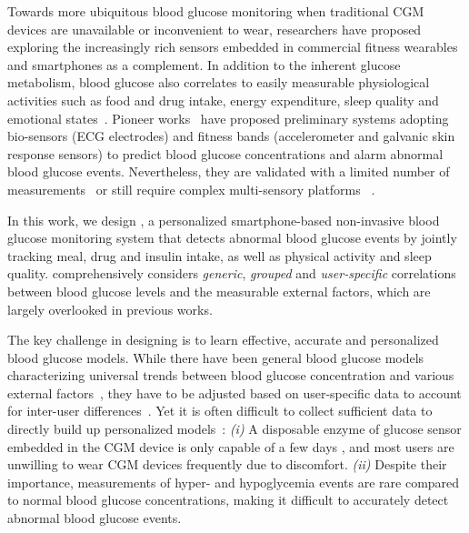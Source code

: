 Towards more ubiquitous blood glucose monitoring when traditional CGM devices are unavailable or inconvenient to wear, researchers have proposed exploring the increasingly rich sensors embedded in commercial fitness wearables and smartphones as a complement.
In addition to the inherent glucose metabolism, blood glucose also correlates to easily measurable physiological activities such as food and drug intake, energy expenditure, sleep quality and emotional states~\cite{bib:DRCP15:Iwasaki}.
Pioneer works~\cite{bib:EMBC12:Nguyen} \cite{bib:SEMPER16:Ranvier} \cite{bib:JDST14:Sobel} have proposed preliminary systems adopting bio-sensors (\eg ECG electrodes) and fitness bands (\eg accelerometer and galvanic skin response sensors) to predict blood glucose concentrations and alarm abnormal blood glucose events.
Nevertheless, they are validated with a limited number of measurements~\cite{bib:SEMPER16:Ranvier}  or still require complex multi-sensory platforms~\cite{bib:EMBC12:Nguyen} \cite{bib:JDST14:Sobel}.

In this work, we design \sysname, a personalized smartphone-based non-invasive blood glucose monitoring system that detects abnormal blood glucose events by jointly tracking meal, drug and insulin intake, as well as physical activity and sleep quality.
\sysname comprehensively considers \textit{generic}, \textit{grouped} and \textit{user-specific} correlations between blood glucose levels and the measurable external factors, which are largely overlooked in previous works.


The key challenge in designing \sysname is to learn effective, accurate and personalized blood glucose models.
While there have been general blood glucose models characterizing universal trends between blood glucose concentration and various external factors~\cite{bib:IJNMBE16:Oviedo}, they have to be adjusted based on user-specific data to account for inter-user differences~\cite{bib:ICMLA13:Bunescu}.
Yet it is often difficult to collect sufficient data to directly build up personalized models~\cite{bib:KDHealth16:Marling}:
\emph{(i)}
A disposable enzyme of glucose sensor embedded in the CGM device is only capable of a few days \cite{bib:CGM_wiki} \cite{bib:CGM_wave}, and most users are unwilling to wear CGM devices frequently due to discomfort.
\emph{(ii)}
Despite their importance, measurements of hyper- and hypoglycemia events are rare compared to normal blood glucose concentrations, making it difficult to accurately detect abnormal blood glucose events.

